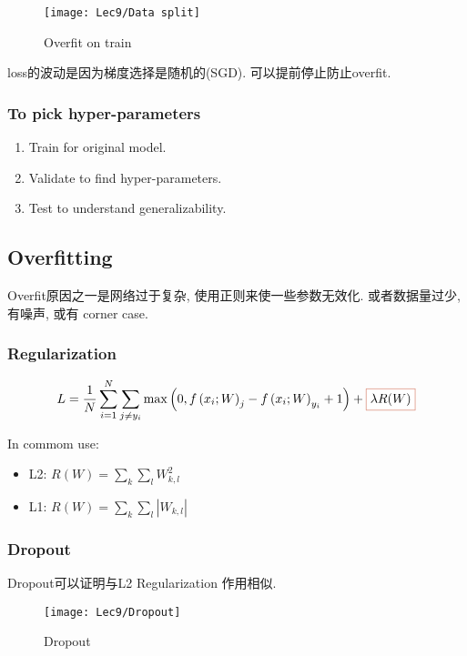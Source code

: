 \begin{figure}[H]
    \centering
    \texttt{[image: Lec9/Data split]}
    \caption{Overfit on train}
\end{figure}

loss的波动是因为梯度选择是随机的(SGD). 可以提前停止防止overfit. 

\subsubsection{To pick hyper-parameters}
\begin{enumerate}
    \item Train for original model.
    \item Validate to find hyper-parameters.
    \item Test to understand generalizability.
\end{enumerate}

\subsection{Overfitting}
Overfit原因之一是网络过于复杂, 使用正则来使一些参数无效化. 或者数据量过少, 有噪声, 或有 corner case. 

\subsubsection{Regularization}
\begin{align*}
    L=\frac{1}{N}\sum_{i=1}^N \sum_{j\ne y_i} \max\left( 0,f\left(x_i;W\right)_j-f\left(x_i;W\right)_{y_i}+1 \right)+\fcolorbox{light_red}{white}{$\lambda R(W)$}
\end{align*}

In commom use: 
\begin{itemize}
    \item L2: $R(W)=\sum_k \sum_l W_{k,l}^2$
    \item L1: $R(W)=\sum_k \sum_l \left|W_{k,l}\right|$
\end{itemize}

\subsubsection{Dropout}
Dropout可以证明与L2 Regularization 作用相似. 

\begin{figure}[H]
    \centering
    \texttt{[image: Lec9/Dropout]}
    \caption{Dropout}
\end{figure}

